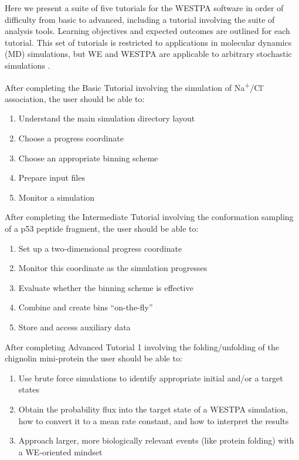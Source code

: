 \documentclass[9pt,tutorial]{livecoms}
\begin{document}
Here we present a suite of five tutorials for the WESTPA software in order of difficulty from basic to advanced, including a tutorial involving the suite of analysis tools. 
Learning objectives and expected outcomes are outlined for each tutorial. 
This set of tutorials is restricted to applications in molecular dynamics (MD) simulations, but WE and WESTPA are applicable to arbitrary stochastic simulations \citep{Donovan2013,Donovan2016,Read2018}.

After completing the Basic Tutorial involving the simulation of Na\textsuperscript{+}/Cl\textsuperscript{-} association, the user should be able to: 
\begin{enumerate}
\item Understand the main simulation directory layout
\item Choose a progress coordinate
\item Choose an appropriate binning scheme
\item Prepare input files
\item Monitor a simulation
\end{enumerate}

After completing the Intermediate Tutorial involving the conformation sampling of a p53 peptide fragment, the user should be able to:
\begin{enumerate}
\item Set up a two-dimensional progress coordinate
\item Monitor this coordinate as the simulation progresses
\item Evaluate whether the binning scheme is effective
\item Combine and create bins “on-the-fly”
\item Store and access auxiliary data
\end{enumerate}

After completing Advanced Tutorial 1 involving the folding/unfolding of the chignolin mini-protein the user should be able to:
\begin{enumerate}
\item Use brute force simulations to identify appropriate initial and/or a target states
\item Obtain the probability flux into the target state of a WESTPA simulation, how to convert it to a mean rate constant, and how to interpret the results
\item Approach larger, more biologically relevant events (like protein folding) with a WE-oriented mindset
\end{enumerate}
\end{document}
